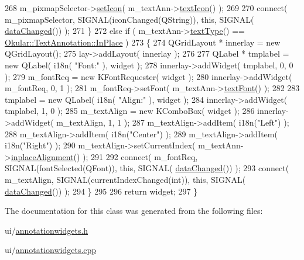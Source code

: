 \begin{DoxyCode}
268         m\_pixmapSelector->\hyperlink{classPixmapPreviewSelector_a9ba6710637ffc9b0f5c8eac83aaec671}{setIcon}( m\_textAnn->\hyperlink{classOkular_1_1TextAnnotation_a40844236e2ea8684a6b439c2c3784821}{textIcon}() );
269 
270         connect( m\_pixmapSelector, SIGNAL(iconChanged(QString)), \textcolor{keyword}{this}, SIGNAL(
      \hyperlink{classAnnotationWidget_af9dcb02a8b69a602225c9844b5deb6d4}{dataChanged}()) );
271     \}
272     \textcolor{keywordflow}{else} \textcolor{keywordflow}{if} ( m\_textAnn->\hyperlink{classOkular_1_1TextAnnotation_acf75a9a22542d3008a486298972e6dcf}{textType}() == \hyperlink{classOkular_1_1TextAnnotation_af560204454bf812797bc95bea730b06ea2a746e9125e8cf53627335a8af01b998}{Okular::TextAnnotation::InPlace}
       )
273     \{
274         QGridLayout * innerlay = \textcolor{keyword}{new} QGridLayout();
275         lay->addLayout( innerlay );
276 
277         QLabel * tmplabel = \textcolor{keyword}{new} QLabel( i18n( \textcolor{stringliteral}{"Font:"} ), widget );
278         innerlay->addWidget( tmplabel, 0, 0 );
279         m\_fontReq = \textcolor{keyword}{new} KFontRequester( widget );
280         innerlay->addWidget( m\_fontReq, 0, 1 );
281         m\_fontReq->setFont( m\_textAnn->\hyperlink{classOkular_1_1TextAnnotation_aa48f194058046e70141412a5e85e7199}{textFont}() );
282 
283         tmplabel = \textcolor{keyword}{new} QLabel( i18n( \textcolor{stringliteral}{"Align:"} ), widget );
284         innerlay->addWidget( tmplabel, 1, 0 );
285         m\_textAlign = \textcolor{keyword}{new} KComboBox( widget );
286         innerlay->addWidget( m\_textAlign, 1, 1 );
287         m\_textAlign->addItem( i18n(\textcolor{stringliteral}{"Left"}) );
288         m\_textAlign->addItem( i18n(\textcolor{stringliteral}{"Center"}) );
289         m\_textAlign->addItem( i18n(\textcolor{stringliteral}{"Right"}) );
290         m\_textAlign->setCurrentIndex( m\_textAnn->\hyperlink{classOkular_1_1TextAnnotation_ada96fce5c424867d6b48a8ae39a8cace}{inplaceAlignment}() );
291 
292         connect( m\_fontReq, SIGNAL(fontSelected(QFont)), \textcolor{keyword}{this}, SIGNAL(
      \hyperlink{classAnnotationWidget_af9dcb02a8b69a602225c9844b5deb6d4}{dataChanged}()) );
293         connect( m\_textAlign, SIGNAL(currentIndexChanged(\textcolor{keywordtype}{int})), \textcolor{keyword}{this}, SIGNAL(
      \hyperlink{classAnnotationWidget_af9dcb02a8b69a602225c9844b5deb6d4}{dataChanged}()) );
294     \}
295 
296     \textcolor{keywordflow}{return} widget;
297 \}
\end{DoxyCode}


The documentation for this class was generated from the following files\+:\begin{DoxyCompactItemize}
\item 
ui/\hyperlink{annotationwidgets_8h}{annotationwidgets.\+h}\item 
ui/\hyperlink{annotationwidgets_8cpp}{annotationwidgets.\+cpp}\end{DoxyCompactItemize}
